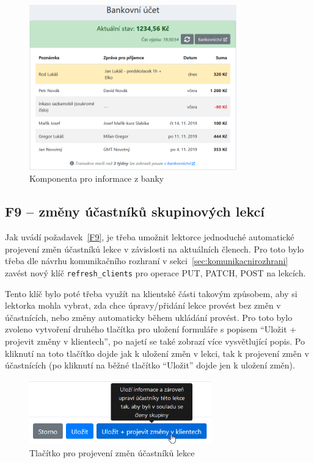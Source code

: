 \begin{figure}[h]\centering
    \includegraphics[width=0.8\textwidth]{img/ui-screen-banka.png}
    \caption{Komponenta pro informace z banky}\label{fig:ui-screen-banka}
\end{figure}

\subsection{F9 -- změny účastníků skupinových lekcí}

Jak uvádí požadavek~\ref{F9}, je třeba umožnit lektorce jednoduché automatické projevení změn účastníků lekce v závislosti na aktuálních členech. Pro toto bylo třeba dle návrhu komunikačního rozhraní v sekci~\ref{sec:komunikacnirozhrani} zavést nový klíč \verb|refresh_clients| pro operace PUT, PATCH, POST na lekcích.

Tento klíč bylo poté třeba využít na klientské části takovým způsobem, aby si lektorka mohla vybrat, zda chce úpravy/přidání lekce provést bez změn v účastnících, nebo změny automaticky během ukládání provést. Pro toto bylo zvoleno vytvoření druhého tlačítka pro uložení formuláře s popisem \enquote{Uložit + projevit změny v klientech}, po najetí se také zobrazí více vysvětlující popis. Po kliknutí na toto tlačítko dojde jak k uložení změn v lekci, tak k projevení změn v účastnících (po kliknutí na běžné tlačítko \enquote{Uložit} dojde jen k uložení změn).

\begin{figure}[h]\centering
    \includegraphics[width=0.7\textwidth]{img/ui-screen-formular-projevenizmen.png}
    \caption{Tlačítko pro projevení změn účastníků lekce}\label{fig:ui-screen-formular-projevenizmen}
\end{figure}

